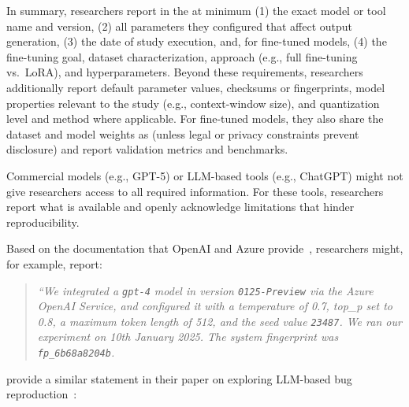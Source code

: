 In summary, researchers \must report in the \paper at minimum (1) the exact model or tool name and version, (2) all parameters they configured that affect output generation, (3) the date of study execution, and, for fine-tuned models, (4) the fine-tuning goal, dataset characterization, approach (e.g., full fine-tuning vs.\ LoRA), and hyperparameters. Beyond these requirements, researchers \should additionally report default parameter values, checksums or fingerprints, model properties relevant to the study (e.g., context-window size), and quantization level and method where applicable. For fine-tuned models, they \should also share the dataset and model weights as \supplementarymaterial (unless legal or privacy constraints prevent disclosure) and report validation metrics and benchmarks.

Commercial models (e.g., GPT-5) or LLM-based tools (e.g., ChatGPT) might not give researchers access to all required information.
For these tools, researchers \should report what is available and openly acknowledge limitations that hinder reproducibility.


Based on the documentation that OpenAI and Azure provide~\cite{OpenAI25, Azure25}, researchers might, for example, report:

\begin{quote}
\it
 ``We integrated a  \texttt{gpt-4} model in version \texttt{0125-Preview} via the Azure OpenAI Service, and configured it with a temperature of 0.7, top\_p set to 0.8, a maximum token length of 512, and the  seed value \texttt{23487}.
 We ran our experiment on 10th January 2025. The system fingerprint was \texttt{fp\_6b68a8204b}.
\end{quote}

\citeauthor{DBLP:conf/icse/KangYY23} provide a similar statement in their paper on exploring LLM-based bug reproduction~\cite{DBLP:conf/icse/KangYY23}:

